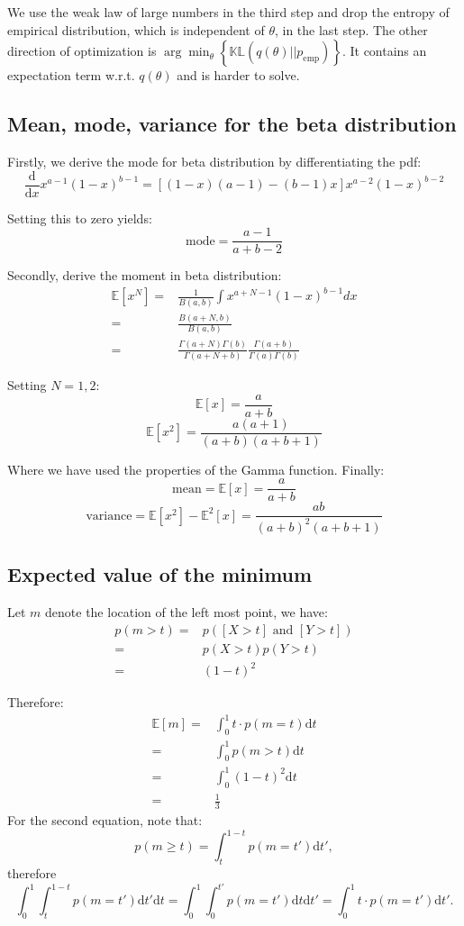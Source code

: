 \documentclass[UTF8]{ctexart}
\begin{document}
We use the weak law of large numbers in the third step and drop the entropy of empirical distribution, which is independent of $\theta$, in the last step.
The other direction of optimization is $\arg\min_{\theta}\left\{\mathbb{KL}(q(\theta)||p_{\text{emp}}) \right\}$.
It contains an expectation term w.r.t. $q(\theta)$ and is harder to solve. 

\subsection{Mean, mode, variance for the beta distribution}
Firstly, we derive the mode for beta distribution by differentiating the pdf:
$$\frac{\text{d}}{\text{d}x}x^{a-1}(1-x)^{b-1}=[(1-x)(a-1)-(b-1)x]x^{a-2}(1-x)^{b-2}$$

Setting this to zero yields:
$$\text{mode}=\frac{a-1}{a+b-2}$$

Secondly, derive the moment in beta distribution:
\begin{align}
\mathbb{E}[x^{N}]=&\frac{1}{B(a,b)}\int x^{a+N-1}(1-x)^{b-1} dx \nonumber \\
=&\frac{B(a+N,b)}{B(a,b)} \nonumber \\
=&\frac{\Gamma(a+N)\Gamma(b)}{\Gamma(a+N+b)} \frac{\Gamma(a+b)}{\Gamma(a)\Gamma(b)} \nonumber 
\end{align}

Setting $N=1,2$:
$$\mathbb{E}[x]=\frac{a}{a+b}$$
$$\mathbb{E}[x^{2}]=\frac{a(a+1)}{(a+b)(a+b+1)}$$

Where we have used the properties of the Gamma function. 
Finally:
$$\text{mean}=\mathbb{E}[x]=\frac{a}{a+b}$$
$$\text{variance}=\mathbb{E}[x^{2}]-\mathbb{E}^{2}[x]=\frac{ab}{(a+b)^{2}(a+b+1)}$$

\subsection{Expected value of the minimum}
Let $m$ denote the location of the left most point, we have:
\begin{align}
p(m>t)=&p([X>t] \text{ and } [Y>t])\nonumber \\
=&p(X>t)p(Y>t) \nonumber \\
=&(1-t)^{2} \nonumber
\end{align}

Therefore:
\begin{align}
\mathbb{E}[m]=&\int_{0}^{1} t\cdot p(m=t)\text{d}t \nonumber \\
=&\int_{0}^{1} p(m>t)\text{d}t \nonumber \\
=&\int_{0}^{1}(1-t)^{2}\text{d}t \nonumber \\
=&\frac{1}{3}\nonumber
\end{align}
For the second equation, note that:
$$p(m\geq t)=\int_{t}^{1-t}p(m=t')\text{d}t',$$
therefore
$$\int_{0}^{1}\int_{t}^{1-t}p(m=t')\text{d}t'\text{d}t=\int_{0}^{1}\int_{0}^{t'}p(m=t')\text{d}t\text{d}t'=\int_{0}^{1}t\cdot p(m=t')\text{d}t'.$$
\end{document}
